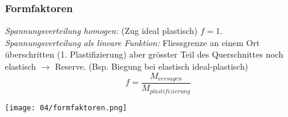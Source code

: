         \subsubsection{Formfaktoren}
            \textit{Spannungsverteilung homogen:} (Zug ideal plastisch) $f=1$.
            \\\textit{Spannungsverteilung als lineare Funktion:} Fliessgrenze an einem Ort überschritten (1. Plastifizierung) aber grösster Teil des Querschnittes noch elastisch $\rightarrow$ Reserve. (Bsp. Biegung bei elastisch ideal-plastisch)
            \[f=\frac{M_{versagen}}{M_{plastifizierung}}\]
            \begin{center}
                \texttt{[image: 04/formfaktoren.png]}
            \end{center}
    
            